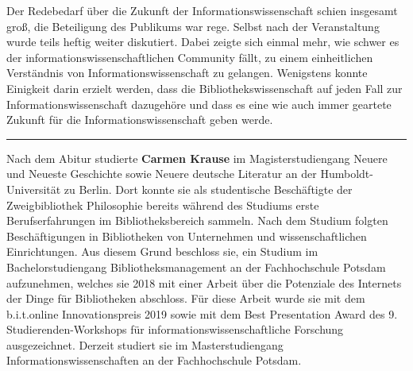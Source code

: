 \documentclass[a4paper,
fontsize=11pt,
oneside,
numbers=noperiodatend,
parskip=half-,
bibliography=totoc,
final
]{scrartcl}
\begin{document}
Der Redebedarf über die Zukunft der Informationswissenschaft schien
insgesamt groß, die Beteiligung des Publikums war rege. Selbst nach der
Veranstaltung wurde teils heftig weiter diskutiert. Dabei zeigte sich
einmal mehr, wie schwer es der informationswissenschaftlichen Community
fällt, zu einem einheitlichen Verständnis von Informationswissenschaft
zu gelangen. Wenigstens konnte Einigkeit darin erzielt werden, dass die
Bibliothekswissenschaft auf jeden Fall zur Informationswissenschaft
dazugehöre und dass es eine wie auch immer geartete Zukunft für die
Informationswissenschaft geben werde.

\begin{center}\rule{0.5\linewidth}{0.5pt}\end{center}

Nach dem Abitur studierte \textbf{Carmen Krause} im Magisterstudiengang
Neuere und Neueste Geschichte sowie Neuere deutsche Literatur an der
Humboldt-Universität zu Berlin. Dort konnte sie als studentische
Beschäftigte der Zweigbibliothek Philosophie bereits während des
Studiums erste Berufserfahrungen im Bibliotheksbereich sammeln. Nach dem
Studium folgten Beschäftigungen in Bibliotheken von Unternehmen und
wissenschaftlichen Einrichtungen. Aus diesem Grund beschloss sie, ein
Studium im Bachelorstudiengang Bibliotheksmanagement an der
Fachhochschule Potsdam aufzunehmen, welches sie 2018 mit einer Arbeit
über die Potenziale des Internets der Dinge für Bibliotheken abschloss.
Für diese Arbeit wurde sie mit dem b.i.t.online Innovationspreis 2019
sowie mit dem Best Presentation Award des 9. Studierenden-Workshops für
informationswissenschaftliche Forschung ausgezeichnet. Derzeit studiert
sie im Masterstudiengang Informationswissenschaften an der
Fachhochschule Potsdam.
\end{document}
